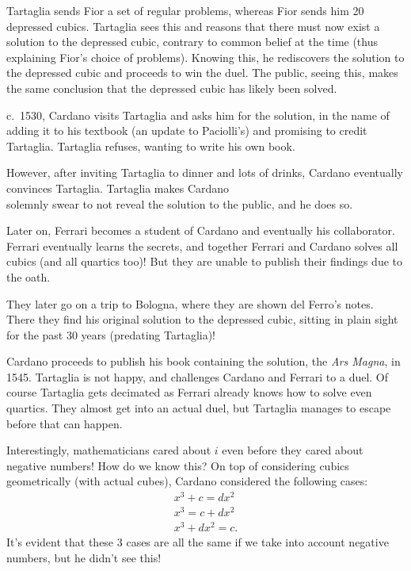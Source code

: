Tartaglia sends Fior a set of regular problems, 
whereas Fior sends him 20 depressed cubics.
Tartaglia sees this and reasons that there must now
exist a solution to the depressed cubic, contrary to
common belief at the time (thus explaining Fior's
choice of problems). Knowing this, he rediscovers
the solution to the depressed cubic and proceeds to
win the duel. The public, seeing this, makes the same
conclusion that the depressed cubic has likely been
solved.

c.~1530, Cardano visits Tartaglia and asks him for the
solution, in the name of adding it to his textbook
(an update to Paciolli's) and promising to credit
Tartaglia. Tartaglia refuses, wanting to write his
own book.

However, after inviting Tartaglia to dinner and lots
of drinks, Cardano eventually convinces Tartaglia.
Tartaglia makes Cardano \\ solemnly swear to not reveal
the solution to the public, and he does so.

Later on, Ferrari becomes a student of Cardano and
eventually his collaborator. Ferrari eventually learns
the secrets, and together Ferrari and Cardano solves
all cubics (and all quartics too)! But they are unable
to publish their findings due to the oath.

They later go on a trip to Bologna, where they are
shown del Ferro's notes. There they find his original
solution to the depressed cubic, sitting in plain sight
for the past $30$ years (predating Tartaglia)!

Cardano proceeds to publish his book containing the
solution, the \textit{Ars Magna}, in 1545. Tartaglia
is not happy, and challenges Cardano and Ferrari to a
duel. Of course Tartaglia gets decimated as Ferrari
already knows how to solve even quartics. They almost
get into an actual duel, but Tartaglia manages to
escape before that can happen.


\begin{tcolorbox}[title=Note: Negative numbers, sharp corners, breakable, enhanced, parbox=false]
Interestingly, mathematicians cared about $i$ even
before they cared about negative numbers! How do we know
this? On top of considering cubics geometrically (with
actual cubes), Cardano considered the following cases:
\begin{gather*}
  x^3 + c = dx^2 \\
  x^3 = c + dx^2 \\
  x^3 + dx^2 = c.
\end{gather*}
It's evident that these 3 cases are all the same if
we take into account negative numbers, but he didn't see
this!
\end{tcolorbox}

